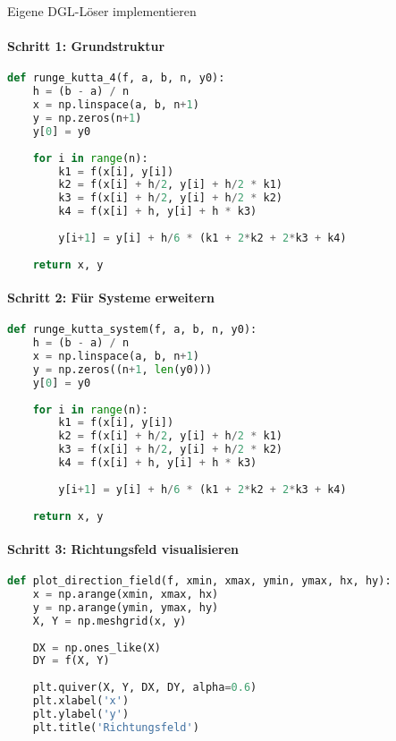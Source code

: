\begin{KR}{Eigene DGL-Löser implementieren}
\paragraph{Schritt 1: Grundstruktur}
\begin{lstlisting}[language=Python, style=basesmol]
def runge_kutta_4(f, a, b, n, y0):
    h = (b - a) / n
    x = np.linspace(a, b, n+1)
    y = np.zeros(n+1)
    y[0] = y0
    
    for i in range(n):
        k1 = f(x[i], y[i])
        k2 = f(x[i] + h/2, y[i] + h/2 * k1)
        k3 = f(x[i] + h/2, y[i] + h/2 * k2)
        k4 = f(x[i] + h, y[i] + h * k3)
        
        y[i+1] = y[i] + h/6 * (k1 + 2*k2 + 2*k3 + k4)
    
    return x, y
\end{lstlisting}

\paragraph{Schritt 2: Für Systeme erweitern}
\begin{lstlisting}[language=Python, style=basesmol]
def runge_kutta_system(f, a, b, n, y0):
    h = (b - a) / n
    x = np.linspace(a, b, n+1)
    y = np.zeros((n+1, len(y0)))
    y[0] = y0
    
    for i in range(n):
        k1 = f(x[i], y[i])
        k2 = f(x[i] + h/2, y[i] + h/2 * k1)
        k3 = f(x[i] + h/2, y[i] + h/2 * k2)
        k4 = f(x[i] + h, y[i] + h * k3)
        
        y[i+1] = y[i] + h/6 * (k1 + 2*k2 + 2*k3 + k4)
    
    return x, y
\end{lstlisting}

\paragraph{Schritt 3: Richtungsfeld visualisieren}
\begin{lstlisting}[language=Python, style=basesmol]
def plot_direction_field(f, xmin, xmax, ymin, ymax, hx, hy):
    x = np.arange(xmin, xmax, hx)
    y = np.arange(ymin, ymax, hy)
    X, Y = np.meshgrid(x, y)
    
    DX = np.ones_like(X)
    DY = f(X, Y)
    
    plt.quiver(X, Y, DX, DY, alpha=0.6)
    plt.xlabel('x')
    plt.ylabel('y')
    plt.title('Richtungsfeld')
\end{lstlisting}
\end{KR}

